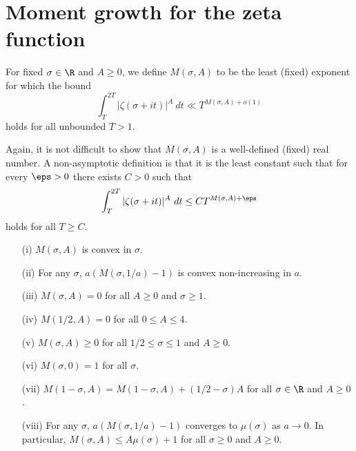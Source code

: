 \chapter{Moment growth for the zeta function}

\begin{definition}\label{zeta-moment-def}  For fixed $\sigma \in \R$ and $A \geq 0$, we define $M(\sigma,A)$ to be the least (fixed) exponent for which the bound
$$ \int_T^{2T} |\zeta(\sigma+it)|^A\ dt \ll T^{M(\sigma,A)+o(1)}$$
holds for all unbounded $T > 1$.
\end{definition}

Again, it is not difficult to show that $M(\sigma,A)$ is a well-defined (fixed) real number.  A non-asymptotic definition is that it is the least constant such that for every $\eps>0$ there exists $C>0$ such that
$$ \int_T^{2T} |\zeta(\sigma+it)|^A\ dt \leq C T^{M(\sigma,A)+\eps}$$
holds for all $T \geq C$.

\begin{lemma}\label{zeta-moment-basic}
\begin{itemize}
\item[(i)] $M(\sigma,A)$ is convex in $\sigma$.
\item[(ii)] For any $\sigma$, $a (M(\sigma,1/a)-1)$ is convex non-increasing in $a$.
\item[(iii)] $M(\sigma,A)=0$ for all $A \geq 0$ and $\sigma \geq 1$. 
\item[(iv)] $M(1/2,A)=0$ for all $0 \leq A \leq 4$.
\item[(v)] $M(\sigma,A) \geq 0$ for all $1/2 \leq \sigma \leq 1$ and $A \geq 0$.
\item[(vi)] $M(\sigma,0) = 1$ for all $\sigma$.
\item[(vii)] $M(1-\sigma,A) = M(1-\sigma,A) + (1/2-\sigma) A$ for all $\sigma \in \R$ and $A \geq 0$.
\item[(viii)] For any $\sigma$, $a(M(\sigma,1/a)-1)$ converges to $\mu(\sigma)$ as $a \to 0$.  In particular, $M(\sigma,A) \leq A \mu(\sigma) + 1$ for all $\sigma \geq 0$ and $A \geq 0$.
\end{itemize}
\end{lemma}

